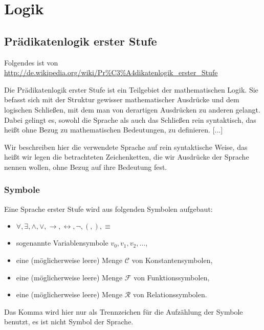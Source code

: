 \chapter{Logik}
\section{Prädikatenlogik erster Stufe}
Folgendes ist von \url{http://de.wikipedia.org/wiki/Pr%C3%A4dikatenlogik_erster_Stufe}

Die Prädikatenlogik erster Stufe ist ein Teilgebiet der mathematischen Logik. Sie befasst sich mit der Struktur gewisser mathematischer Ausdrücke und dem logischen Schließen, mit dem man von derartigen Ausdrücken zu anderen gelangt. Dabei gelingt es, sowohl die Sprache als auch das Schließen rein syntaktisch, das heißt ohne Bezug zu mathematischen Bedeutungen, zu definieren.
[...]

Wir beschreiben hier die verwendete Sprache auf rein syntaktische Weise, das heißt wir legen die betrachteten Zeichenketten, die wir Ausdrücke der Sprache nennen wollen, ohne Bezug auf ihre Bedeutung fest. 

\subsection{Symbole}
Eine Sprache erster Stufe wird aus folgenden Symbolen aufgebaut:

\begin{itemize}
	\item $\forall, \exists, \land, \lor, \rightarrow, \leftrightarrow, \neg, (, ), \equiv$
	\item sogenannte Variablensymbole $v_0,v_1,v_2,\ldots$,
	\item eine (möglicherweise leere) Menge $\mathcal C$ von Konstantensymbolen, 
	\item eine (möglicherweise leere) Menge $\mathcal F$ von Funktionssymbolen, 
	\item eine (möglicherweise leere) Menge $\mathcal R$ von Relationssymbolen.
\end{itemize}

Das Komma wird hier nur als Trennzeichen für die Aufzählung der Symbole benutzt, es ist nicht Symbol der Sprache.

